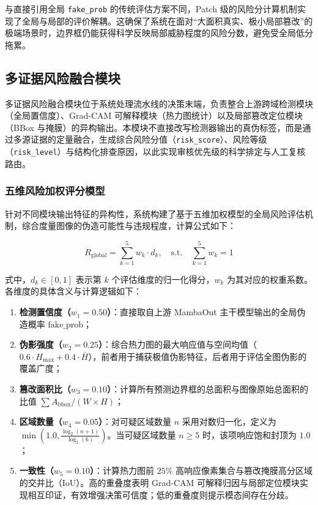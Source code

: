 \documentclass[UTF8, a4paper, 12pt]{ctexart}
\begin{document}
与直接引用全局 \texttt{fake\_prob} 的传统评估方案不同，Patch 级的风险分计算机制实现了全局与局部的评价解耦。这确保了系统在面对“大面积真实、极小局部篡改”的极端场景时，边界框仍能获得科学反映局部威胁程度的风险分数，避免受全局低分拖累。



\subsection{多证据风险融合模块}

多证据风险融合模块位于系统处理流水线的决策末端，负责整合上游跨域检测模块（全局置信度）、Grad-CAM 可解释模块（热力图统计）以及局部篡改定位模块（BBox 与掩膜）的异构输出。本模块不直接改写检测器输出的真伪标签，而是通过多源证据的定量融合，生成综合风险分值（\texttt{risk\_score}）、风险等级（\texttt{risk\_level}）与结构化排查原因，以此实现审核优先级的科学排定与人工复核路由。

\subsubsection{五维风险加权评分模型}
\label{sec:global-risk-scoring}

针对不同模块输出特征的异构性，系统构建了基于五维加权模型的全局风险评估机制，综合度量图像的伪造可能性与违规程度，计算公式如下：

\begin{equation}
R_{\text{global}} = \sum_{k=1}^{5} w_k \cdot d_k, \quad \text{s.t.} \quad \sum_{k=1}^{5} w_k = 1
\end{equation}

式中，$d_k \in [0, 1]$ 表示第 $k$ 个评估维度的归一化得分，$w_k$ 为其对应的权重系数。各维度的具体含义与计算逻辑如下：

\begin{enumerate}
 \item \textbf{检测置信度（$w_1 = 0.50$）}：直接取自上游 MambaOut 主干模型输出的全局伪造概率 $\text{fake\_prob}$；
 \item \textbf{伪影强度（$w_2 = 0.25$）}：综合热力图的最大响应值与空间均值（$0.6 \cdot H_{\max} + 0.4 \cdot \bar{H}$），前者用于捕获极值伪影特征，后者用于评估全图伪影的覆盖广度；
 \item \textbf{篡改面积比（$w_3 = 0.10$）}：计算所有预测边界框的总面积与图像原始总面积的比值 $\sum A_{\text{bbox}} / (W \times H)$；
 \item \textbf{区域数量（$w_4 = 0.05$）}：对可疑区域数量 $n$ 采用对数归一化，定义为 $\min\left(1.0, \frac{\log_2(n+1)}{\log_2(6)}\right)$。当可疑区域数量 $n \ge 5$ 时，该项响应饱和封顶为 $1.0$；
 \item \textbf{一致性（$w_5 = 0.10$）}：计算热力图前 $25\%$ 高响应像素集合与篡改掩膜高分区域的交并比（$\text{IoU}$）。高的重叠度表明 Grad-CAM 可解释归因与局部定位模块实现相互印证，有效增强决策可信度；低的重叠度则提示模态间存在分歧。
\end{enumerate}
\end{document}
